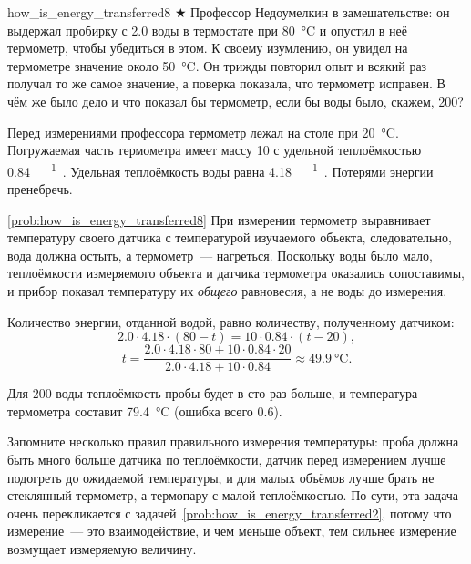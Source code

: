 \begin{problem}{}{how_is_energy_transferred8}
    $\bigstar$ Профессор Недоумелкин в замешательстве: он выдержал пробирку с \qty{2,0}{\ruG} воды в термостате при \qty{80}{\degreeCelsius} и опустил в неё термометр, чтобы убедиться в этом. К своему изумлению, он увидел на термометре значение около \qty{50}{\degreeCelsius}. Он трижды повторил опыт и всякий раз получал то же самое значение, а поверка показала, что термометр исправен. В чём же было дело и что показал бы термометр, если бы воды было, скажем, \qty{200}{\ruG}?

    Перед измерениями профессора термометр лежал на столе при \qty{20}{\degreeCelsius}. Погружаемая часть термометра имеет массу \qty{10}{\ruG} с удельной теплоёмкостью \qty{0,84}{\ruJ\per\ruG\ruK}. Удельная теплоёмкость воды равна \qty{4,18}{\ruJ\per\ruG\ruK}. Потерями энергии пренебречь.
    \begin{sol}{\ref{prob:how_is_energy_transferred8}}
        При измерении термометр выравнивает температуру своего датчика с температурой изучаемого объекта, следовательно, вода должна остыть, а термометр~--- нагреться. Поскольку воды было мало, теплоёмкости измеряемого объекта и датчика термометра оказались сопоставимы, и прибор показал температуру их \emph{общего} равновесия, а не воды до измерения.

        Количество энергии, отданной водой, равно количеству, полученному датчиком:
        \begin{equation*}
            \num{2,0} \cdot \num{4,18} \cdot (\num{80} - t) = \num{10} \cdot \num{0,84} \cdot (t - \num{20}),
        \end{equation*}
        \begin{equation*}
            t = \frac{\num{2,0} \cdot \num{4,18} \cdot \num{80} + \num{10} \cdot \num{0,84} \cdot \num{20}}{\num{2,0} \cdot \num{4,18} + \num{10} \cdot \num{0,84}} \approx \qty{49,9}{\degreeCelsius}.
        \end{equation*}

        Для \qty{200}{\ruG} воды теплоёмкость пробы будет в сто раз больше, и температура термометра составит \qty{79,4}{\degreeCelsius} (ошибка всего \qty{0,6}{\ruK}).

        Запомните несколько правил правильного измерения температуры: проба должна быть много больше датчика по теплоёмкости, датчик перед измерением лучше подогреть до ожидаемой температуры, и для малых объёмов лучше брать не стеклянный термометр, а термопару с малой теплоёмкостью. По сути, эта задача очень перекликается с задачей~\ref{prob:how_is_energy_transferred2}, потому что измерение~--- это взаимодействие, и чем меньше объект, тем сильнее измерение возмущает измеряемую величину.
    \end{sol}
\end{problem}

